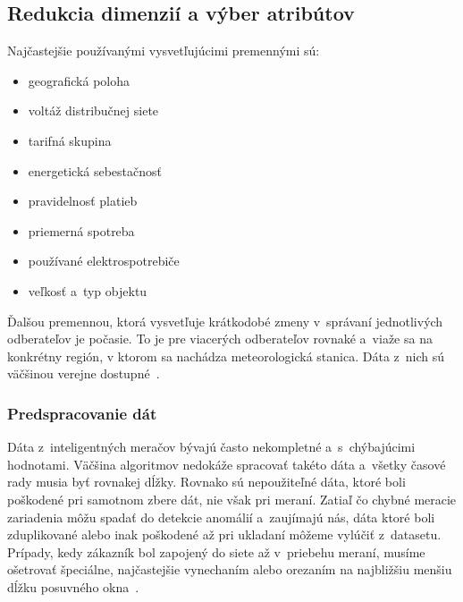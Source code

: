\documentclass[a4paper,twoside,slovak,12pt,appendix]{article}
\begin{document}

\subsection{Redukcia dimenzií a výber atribútov}
Najčastejšie používanými vysvetľujúcimi premennými sú:
\begin{itemize}
  \item geografická poloha
  \item voltáž distribučnej siete
  \item tarifná skupina
  \item energetická sebestačnosť
  \item pravidelnosť platieb
  \item priemerná spotreba
  \item používané elektrospotrebiče
  \item veľkosť a~typ objektu
\end{itemize}
Ďalšou premennou, ktorá vysvetľuje krátkodobé zmeny v~správaní jednotlivých
odberateľov je počasie. To je pre viacerých odberateľov rovnaké a~viaže sa na
konkrétny región, v ktorom sa nachádza meteorologická stanica. Dáta z~nich sú
väčšinou verejne dostupné~\cite{Stankovic2014}.

\subsubsection{Predspracovanie dát}
Dáta z~inteligentných meračov bývajú často nekompletné a~s~chýbajúcimi
hodnotami. Väčšina algoritmov nedokáže spracovať takéto dáta a~všetky časové
rady musia byť rovnakej dĺžky. Rovnako sú nepoužiteľné dáta, ktoré boli
poškodené pri samotnom zbere dát, nie však pri meraní. Zatiaľ čo chybné meracie
zariadenia môžu spadať do detekcie anomálií a~zaujímajú nás, dáta ktoré boli
zduplikované alebo inak poškodené až pri ukladaní môžeme vylúčiť z~datasetu.
Prípady, kedy zákazník bol zapojený do siete až v~priebehu meraní, musíme
ošetrovať špeciálne, najčastejšie vynechaním alebo orezaním na najbližšiu menšiu
dĺžku posuvného okna~\cite{Nagi2009}.
\end{document}

